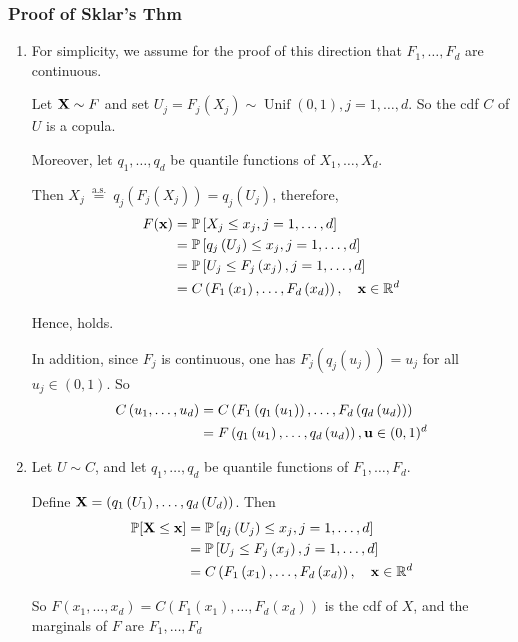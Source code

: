 \subsubsection*{Proof of Sklar’s Thm}
\begin{enumerate}[label = (\arabic*), leftmargin=*]
    \item For simplicity, we assume for the proof of this direction that $F_{1}, \ldots, F_{d}$ are continuous. 
    
    Let $\operatorname{\boldsymbol{\mathbf{X}}} \sim F$ and set $U_{j}=F_{j}\left(X_{j}\right) \sim \operatorname{Unif}(0,1), j=1, \ldots, d$. So the cdf $C$ of $U$ is a copula. 
    
    Moreover, let $q_{1}, \ldots, q_{d}$ be quantile functions of $X_{1}, \ldots, X_{d}$.
    
    Then $X_{j} \stackrel{\text { a.s. }}{=} q_{j}\left(F_{j}\left(X_{j}\right)\right)=q_{j}\left(U_{j}\right)$, therefore,
$$
\begin{aligned}
F(\operatorname{\boldsymbol{\mathbf{x}}}) &=\mathbb{P}\left[X_{j} \leq x_{j}, j=1, \ldots, d\right] \\
&=\mathbb{P}\left[q_{j}\left(U_{j}\right) \leq x_{j}, j=1, \ldots, d\right] \\
&=\mathbb{P}\left[U_{j} \leq F_{j}\left(x_{j}\right), j=1, \ldots, d\right] \\
&=C\left(F_{1}\left(x_{1}\right), \ldots, F_{d}\left(x_{d}\right)\right), \quad \operatorname{\boldsymbol{\mathbf{x}}} \in \mathbb{R}^{d}
\end{aligned}
$$

Hence, \red{(*)} holds.

In addition, since $F_{j}$ is continuous, one has $F_{j}\left(q_{j}\left(u_{j}\right)\right)=u_{j}$ for all $u_{j} \in(0,1)$. So
$$
\begin{aligned}
C\left(u_{1}, \ldots, u_{d}\right) &=C\left(F_{1}\left(q_{1}\left(u_{1}\right)\right), \ldots, F_{d}\left(q_{d}\left(u_{d}\right)\right)\right) \\
&=F\left(q_{1}\left(u_{1}\right), \ldots, q_{d}\left(u_{d}\right)\right), \operatorname{\boldsymbol{\mathbf{u}}} \in(0,1)^{d}
\end{aligned}
$$
    \item Let $U \sim C$, and let $q_{1}, \ldots, q_{d}$ be quantile functions of $F_{1}, \ldots, F_{d}$.
    
Define $\operatorname{\boldsymbol{\mathbf{X}}}=\left(q_{1}\left(U_{1}\right), \ldots, q_{d}\left(U_{d}\right)\right)$. Then
$$
\begin{aligned}
\mathbb{P}[\operatorname{\boldsymbol{\mathbf{X}}} \leq \operatorname{\boldsymbol{\mathbf{x}}}] &=\mathbb{P}\left[q_{j}\left(U_{j}\right) \leq x_{j}, j=1, \ldots, d\right] \\
&=\mathbb{P}\left[U_{j} \leq F_{j}\left(x_{j}\right), j=1, \ldots, d\right] \\
&=C\left(F_{1}\left(x_{1}\right), \ldots, F_{d}\left(x_{d}\right)\right), \quad \operatorname{\boldsymbol{\mathbf{x}}} \in \mathbb{R}^{d}
\end{aligned}
$$

So $F\left(x_{1}, \ldots, x_{d}\right)=C\left(F_{1}\left(x_{1}\right), \ldots, F_{d}\left(x_{d}\right)\right)$ is the cdf of $X$, and the marginals of $F$ are $F_{1}, \ldots, F_{d}$
\end{enumerate}




